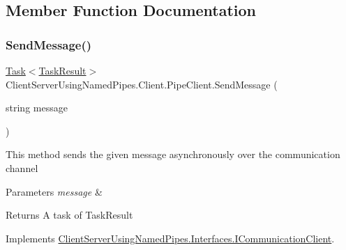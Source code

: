 \subsection{Member Function Documentation}
\mbox{\label{class_client_server_using_named_pipes_1_1_client_1_1_pipe_client_af1b876c52ee2cfc920dcf56ea7434839}} 
\subsubsection{\texorpdfstring{Send\+Message()}{SendMessage()}}
{\footnotesize\ttfamily \hyperlink{class_system_1_1_threading_1_1_tasks_1_1_task}{Task}$<$\hyperlink{class_client_server_using_named_pipes_1_1_utilities_1_1_task_result}{Task\+Result}$>$ Client\+Server\+Using\+Named\+Pipes.\+Client.\+Pipe\+Client.\+Send\+Message (\begin{DoxyParamCaption}\item[{string}]{message }\end{DoxyParamCaption})\hspace{0.3cm}{\ttfamily [inline]}}



This method sends the given message asynchronously over the communication channel 


\begin{DoxyParams}{Parameters}
{\em message} & \\
\hline
\end{DoxyParams}
\begin{DoxyReturn}{Returns}
A task of Task\+Result
\end{DoxyReturn}


Implements \hyperlink{interface_client_server_using_named_pipes_1_1_interfaces_1_1_i_communication_client_a07c2acf92bd0b99d704156010b47eff1}{Client\+Server\+Using\+Named\+Pipes.\+Interfaces.\+I\+Communication\+Client}.

\mbox{\label{class_client_server_using_named_pipes_1_1_client_1_1_pipe_client_a0bb2855199630657cdf070e3c4275b51}} 

